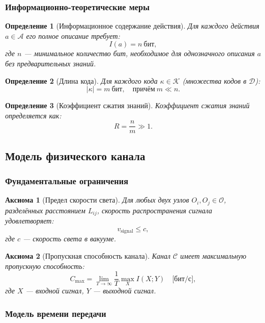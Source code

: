 \documentclass[12pt]{article}
\newtheorem{definition}{Определение}
\newtheorem{axiom}{Аксиома}
\begin{document}
	\subsubsection{Информационно-теоретические меры}
	
	\begin{definition}[Информационное содержание действия]
		Для каждого действия $a \in \mathcal{A}$ его полное описание требует:
		\[
		I(a) = n \ \text{бит},
		\]
		где $n$ — минимальное количество бит, необходимое для однозначного описания $a$ без предварительных знаний.
	\end{definition}
	
	\begin{definition}[Длина кода]
		Для каждого кода $\kappa \in \mathcal{K}$ (множества кодов в $\mathcal{D}$):
		\[
		|\kappa| = m \ \text{бит}, \quad \text{причём} \ m \ll n.
		\]
	\end{definition}
	
	\begin{definition}[Коэффициент сжатия знаний]
		Коэффициент сжатия знаний определяется как:
		\[
		R = \frac{n}{m} \gg 1.
		\]
	\end{definition}
	
	\subsection{Модель физического канала}
	\label{app:channel-model}
	
	\subsubsection{Фундаментальные ограничения}
	
	\begin{axiom}[Предел скорости света]
		Для любых двух узлов $O_i, O_j \in \mathcal{O}$, разделённых расстоянием $L_{ij}$, скорость распространения сигнала удовлетворяет:
		\[
		v_{\text{signal}} \leq c,
		\]
		где $c$ — скорость света в вакууме.
	\end{axiom}
	
	\begin{axiom}[Пропускная способность канала]
		Канал $\mathcal{C}$ имеет максимальную пропускную способность:
		\[
		C_{\text{max}} = \lim_{T \to \infty} \frac{1}{T} \max_{X} I(X; Y) \quad \text{[бит/с]},
		\]
		где $X$ — входной сигнал, $Y$ — выходной сигнал.
	\end{axiom}
	
	\subsubsection{Модель времени передачи}
	
\end{document}

